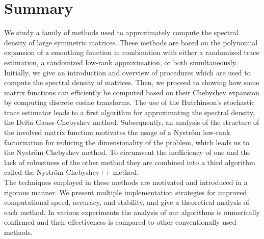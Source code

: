 \chapter*{Summary}
\label{chp:0-summary}

We study a family of methods used to approximately compute the spectral density
of large symmetric matrices. These methods are based on the polynomial expansion
of a smoothing function in combination with either a randomized trace estimation,
a randomized low-rank approximation, or both simultaneously.\\

Initially, we give an introduction and overview of procedures which are used
to compute the spectral density of matrices. Then, we proceed to showing how
some matrix functions can efficiently be computed based on
their Chebyshev expansion by computing discrete cosine transforms.
The use of the Hutchinson's stochastic trace estimator leads to a first
algorithm for approximating the spectral density, the Delta-Gauss-Chebyshev method.
Subsequently, an analysis of the structure of the involved matrix function
motivates the usage of a Nystr\"om low-rank factorization for reducing the
dimensionality of the problem, which leads us to the Nystr\"om-Chebyshev method.
To circumvent the inefficiency of one and the lack of robustness of the other
method they are combined into a third algorithm called the
Nystr\"om-Chebyshev++ method.\\

The techniques employed in these methods are motivated and introduced in a
rigorous manner. We present multiple implementation strategies for improved
computational speed, accuracy, and stability, and give a theoretical analysis
of each method. In various experiments the analysis of our algorithms is
numerically confirmed and their effectiveness is compared to other
conventionally used methods.
